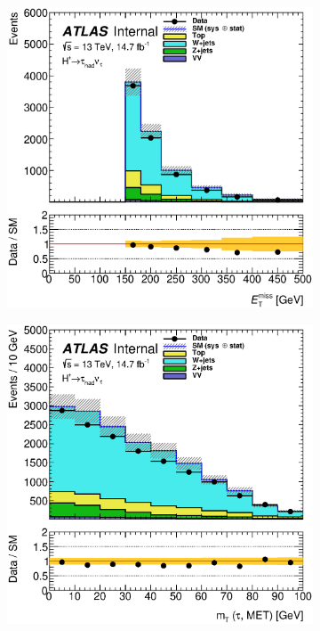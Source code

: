 \begin{figure}[!h]
\begin{subfigure}{0.5\textwidth}
   \includegraphics[width=\textwidth]{figures/met_Wjets.eps}
\caption{\met}
\end{subfigure} %
\begin{subfigure}{0.5\textwidth}
   \includegraphics[width=\textwidth]{figures/mT_Wjets.eps}

\end{subfigure}
\end{figure}
